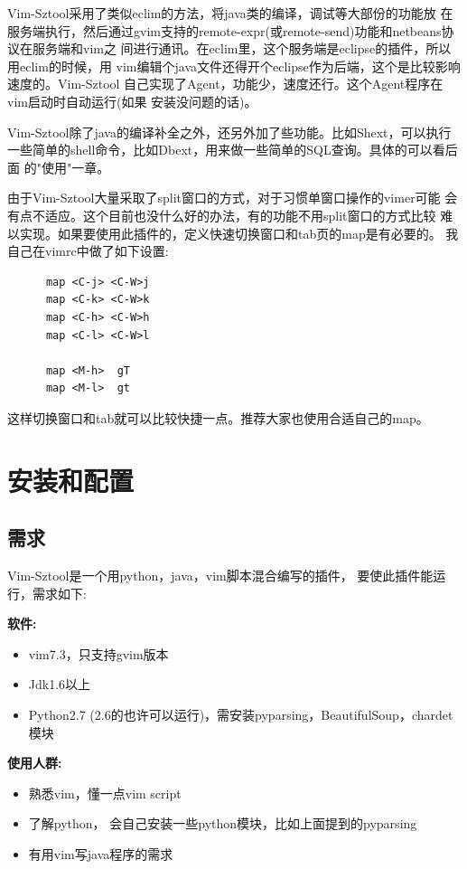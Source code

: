 \documentclass[oneside,openany]{book}
\begin{document}
  Vim-Sztool采用了类似eclim的方法，将java类的编译，调试等大部份的功能放
在服务端执行，然后通过gvim支持的remote-expr(或remote-send)功能和netbeans协议在服务端和vim之
间进行通讯。在eclim里，这个服务端是eclipse的插件，所以用eclim的时候，用
vim编辑个java文件还得开个eclipse作为后端，这个是比较影响速度的。Vim-Sztool
自己实现了Agent，功能少，速度还行。这个Agent程序在vim启动时自动运行(如果
安装没问题的话)。

  Vim-Sztool除了java的编译补全之外，还另外加了些功能。比如Shext，可以执行
一些简单的shell命令，比如Dbext，用来做一些简单的SQL查询。具体的可以看后面
的"使用"一章。

  由于Vim-Sztool大量采取了split窗口的方式，对于习惯单窗口操作的vimer可能
会有点不适应。这个目前也没什么好的办法，有的功能不用split窗口的方式比较
难以实现。如果要使用此插件的，定义快速切换窗口和tab页的map是有必要的。
我自己在vimrc中做了如下设置:

\begin{mdframed}[style=BestPracticeFrame]
    \begin{verbatim}
      map <C-j> <C-W>j
      map <C-k> <C-W>k
      map <C-h> <C-W>h
      map <C-l> <C-W>l

      map <M-h>  gT
      map <M-l>  gt
    \end{verbatim}
\end{mdframed}

这样切换窗口和tab就可以比较快捷一点。推荐大家也使用合适自己的map。


\chapter{安装和配置}
  \section{需求}
  Vim-Sztool是一个用python，java，vim脚本混合编写的插件， 要使此插件能运行，需求如下:

  \textbf{软件:}
    \begin{itemize}
      \item vim7.3，只支持gvim版本
      \item Jdk1.6以上
      \item Python2.7 (2.6的也许可以运行)，需安装pyparsing，BeautifulSoup，chardet模块
    \end{itemize}

  \textbf{使用人群:}
    \begin{itemize}
      \item 熟悉vim，懂一点vim script
      \item 了解python， 会自己安装一些python模块，比如上面提到的pyparsing
      \item 有用vim写java程序的需求
    \end{itemize}
\end{document}
